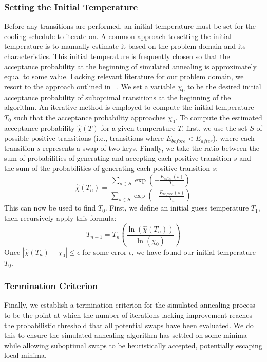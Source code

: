 \subsubsection{Setting the Initial Temperature}
\noindent Before any transitions are performed, an initial temperature must be set for the cooling schedule to iterate on. A common approach to setting the initial temperature is to manually estimate it based on the problem domain and its characteristics. This initial temperature is frequently chosen so that the acceptance probability at the beginning of simulated annealing is approximately equal to some value. Lacking relevant literature for our problem domain, we resort to the approach outlined in  ~\citet{Ben-Ameur2004}. We set a variable $\chi_0$ to be the desired initial acceptance probability of suboptimal transitions at the beginning of the algorithm. An iterative method is employed to compute the initial temperature $T_0$ such that the acceptance probability approaches $\chi_0$. To compute the estimated acceptance probability $\hat{\chi}(T)$ for a given temperature $T$, first, we use the set $S$ of possible positive transitions (i.e., transitions where $E_{before} < E_{after}$), where each transition $s$ represents a swap of two keys. Finally, we take the ratio between the sum of probabilities of generating and accepting each positive transition $s$ and the sum of the probabilities of generating each positive transition $s$:
\begin{equation*}
\hat{\chi}(T_n) = \frac{
    \sum_{s \in S} \exp \left( -\frac{E_{after}(s)}{T_n} \right)}
    {\sum_{s \in S} \exp \left( -\frac{E_{before}(s)}{T_n} \right)}
\end{equation*}
This can now be used to find $T_0$. First, we define an initial guess temperature $T_1$, then recursively apply this formula:
\begin{equation*}
T_{n+1} = T_n \left(\frac{\ln(\hat{\chi}(T_n))}{\ln{(\chi_0)}} \right)
\end{equation*}
Once $|\hat{\chi}(T_n) - \chi_0| \leq \epsilon$ for some error $\epsilon$, we have found our initial temperature $T_0$. 

\subsubsection{Termination Criterion}
\noindent Finally, we establish a termination criterion for the simulated annealing process to be the point at which the number of iterations lacking improvement reaches the probabilistic threshold that all potential swaps have been evaluated. We do this to ensure the simulated annealing algorithm has settled on some minima while allowing suboptimal swaps to be heuristically accepted, potentially escaping local minima.

